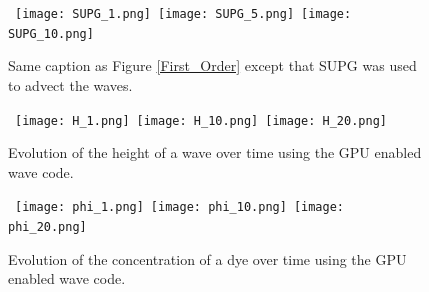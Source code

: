 \begin{figure}[htbp]
\begin{center}
\mbox{
\texttt{[image: SUPG\_1.png]}
\texttt{[image: SUPG\_5.png]}
\texttt{[image: SUPG\_10.png]}
} 
\mbox{  
}
\caption{Same caption as Figure \ref{First_Order} except that SUPG was used to advect the waves.}
\label{fig:SUPG}
\end{center}
\end{figure}

\begin{figure}[htbp]
\begin{center}
\mbox{
\texttt{[image: H\_1.png]}
\texttt{[image: H\_10.png]}
\texttt{[image: H\_20.png]}
} 
\caption{Evolution of the height of a wave over time using the GPU enabled wave code.}
\label{fig:H}
\end{center}
\end{figure}

\begin{figure}[htbp]
\begin{center}
\mbox{
\texttt{[image: phi\_1.png]}
\texttt{[image: phi\_10.png]}
\texttt{[image: phi\_20.png]}
} 
\caption{Evolution of the concentration of a dye over time using the GPU enabled wave code.}
\label{fig:H}
\end{center}
\end{figure}